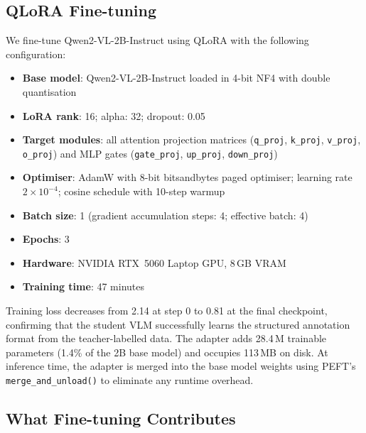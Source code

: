 \subsection{QLoRA Fine-tuning}

We fine-tune Qwen2-VL-2B-Instruct using QLoRA
with the following configuration:

\begin{itemize}
  \item \textbf{Base model}: Qwen2-VL-2B-Instruct
        loaded in 4-bit NF4 with double
        quantisation~\cite{dettmers2023qlora}
  \item \textbf{LoRA rank}: 16; alpha: 32;
        dropout: 0.05
  \item \textbf{Target modules}: all attention
        projection matrices
        (\texttt{q\_proj}, \texttt{k\_proj},
        \texttt{v\_proj}, \texttt{o\_proj})
        and MLP gates
        (\texttt{gate\_proj}, \texttt{up\_proj},
        \texttt{down\_proj})
  \item \textbf{Optimiser}: AdamW with 8-bit
        bitsandbytes paged optimiser;
        learning rate $2 \times 10^{-4}$;
        cosine schedule with 10-step warmup
  \item \textbf{Batch size}: 1 (gradient
        accumulation steps: 4; effective batch: 4)
  \item \textbf{Epochs}: 3
  \item \textbf{Hardware}: NVIDIA RTX~5060
        Laptop GPU, 8\,GB VRAM
  \item \textbf{Training time}: 47 minutes
\end{itemize}

Training loss decreases from 2.14 at step 0 to
0.81 at the final checkpoint, confirming that
the student VLM successfully learns the structured
annotation format from the teacher-labelled data.
The adapter adds 28.4\,M trainable parameters
(1.4\% of the 2B base model) and occupies 113\,MB
on disk.
At inference time, the adapter is merged into the
base model weights using PEFT's \texttt{merge\_and\_unload()}
to eliminate any runtime overhead.

\subsection{What Fine-tuning Contributes}

